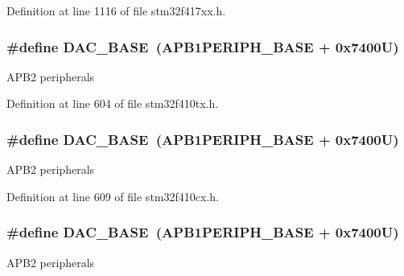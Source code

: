 Definition at line 1116 of file stm32f417xx.\+h.

\subsubsection[{\texorpdfstring{D\+A\+C\+\_\+\+B\+A\+SE}{DAC_BASE}}]{\setlength{\rightskip}{0pt plus 5cm}\#define D\+A\+C\+\_\+\+B\+A\+SE~({\bf A\+P\+B1\+P\+E\+R\+I\+P\+H\+\_\+\+B\+A\+SE} + 0x7400\+U)}\hypertarget{group___peripheral__registers__structures_gad18d0b914c7f68cecbee1a2d23a67d38}{}\label{group___peripheral__registers__structures_gad18d0b914c7f68cecbee1a2d23a67d38}
A\+P\+B2 peripherals 

Definition at line 604 of file stm32f410tx.\+h.

\subsubsection[{\texorpdfstring{D\+A\+C\+\_\+\+B\+A\+SE}{DAC_BASE}}]{\setlength{\rightskip}{0pt plus 5cm}\#define D\+A\+C\+\_\+\+B\+A\+SE~({\bf A\+P\+B1\+P\+E\+R\+I\+P\+H\+\_\+\+B\+A\+SE} + 0x7400\+U)}\hypertarget{group___peripheral__registers__structures_gad18d0b914c7f68cecbee1a2d23a67d38}{}\label{group___peripheral__registers__structures_gad18d0b914c7f68cecbee1a2d23a67d38}
A\+P\+B2 peripherals 

Definition at line 609 of file stm32f410cx.\+h.

\subsubsection[{\texorpdfstring{D\+A\+C\+\_\+\+B\+A\+SE}{DAC_BASE}}]{\setlength{\rightskip}{0pt plus 5cm}\#define D\+A\+C\+\_\+\+B\+A\+SE~({\bf A\+P\+B1\+P\+E\+R\+I\+P\+H\+\_\+\+B\+A\+SE} + 0x7400\+U)}\hypertarget{group___peripheral__registers__structures_gad18d0b914c7f68cecbee1a2d23a67d38}{}\label{group___peripheral__registers__structures_gad18d0b914c7f68cecbee1a2d23a67d38}
A\+P\+B2 peripherals 

